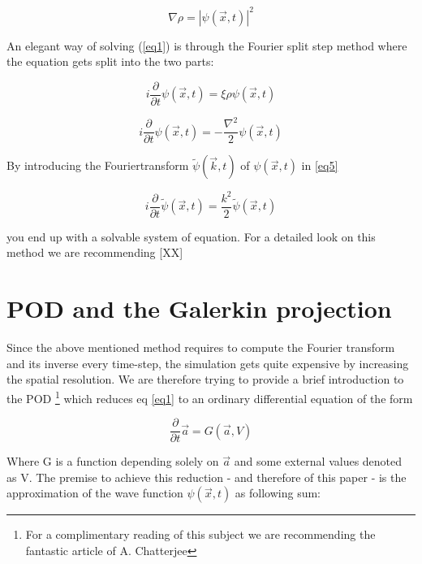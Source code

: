 \documentclass[usenatbib]{mn2e}
\begin{document}
\begin{equation} \label{eq2}
\nabla \rho =\left| \psi\left( \overrightarrow {x},t\right) \right| ^{2}
\end{equation}

An elegant way of solving (\ref{eq1}) is through the Fourier split step method where the equation gets split into the two parts:

\begin{equation} \label{eq3}
i\dfrac {\partial } {\partial t}\psi( \overrightarrow{x},t) = \xi  \rho  \psi( \overrightarrow {x},t)
\end{equation}

\begin{equation} \label{eq4}
i\dfrac {\partial } {\partial t}\psi( \overrightarrow{x},t) = -\dfrac {\nabla ^{2}} {2} \psi( \overrightarrow {x},t)
\end{equation}

By introducing the Fouriertransform \(\widetilde{\psi} (\overrightarrow {k},t)\) of \(\psi (\overrightarrow {x},t)\) in \ref{eq5} 

\begin{equation} \label{eq5}
i\dfrac {\partial } {\partial t}\widetilde{\psi}( \overrightarrow{x},t) = \dfrac {k ^{2}} {2} \widetilde{\psi}( \overrightarrow {x},t)
\end{equation}

you end up with a solvable system of equation. For a detailed look on this method we are recommending [XX]

\section{POD and the Galerkin projection}
Since the above mentioned method requires to compute the Fourier transform and its inverse every time-step, the simulation gets quite expensive by increasing the spatial resolution. We are therefore trying to provide a brief introduction to the POD
\footnote{For a complimentary reading of this subject we are recommending the fantastic article of A. Chatterjee} which reduces eq \ref{eq1} to an ordinary differential equation of the form 

\begin{equation}\label{eq6}
\dfrac {\partial } {\partial t} \overrightarrow{a} = G( \overrightarrow{a},V)
\end{equation} 

Where G is a function depending solely on \(\overrightarrow{a}\) and some external values denoted as V. The premise to achieve this reduction - and therefore of this paper - is the approximation of the wave function \(\psi( \overrightarrow {x},t)\) as following sum:
\end{document}
